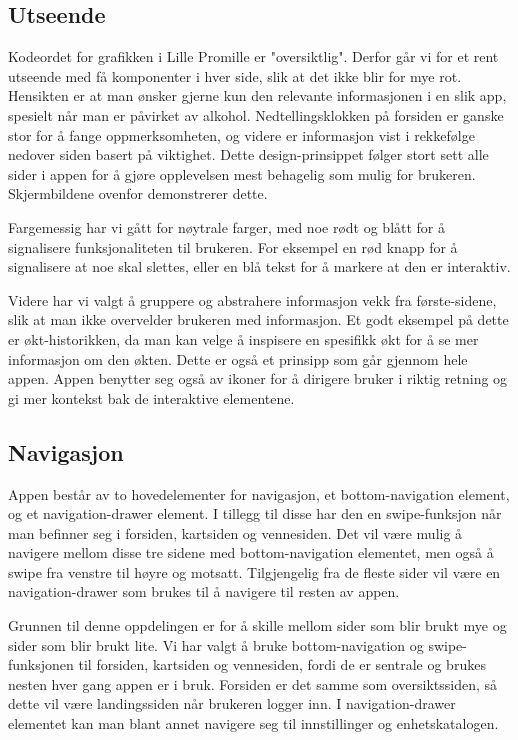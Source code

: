 \documentclass[12pt]{article}
\begin{document}
\subsection{Utseende}
Kodeordet for grafikken i Lille Promille er "oversiktlig". Derfor går vi for et rent utseende med få komponenter i hver side, slik at det ikke blir for mye rot. Hensikten er at man ønsker gjerne kun den relevante informasjonen i en slik app, spesielt når man er påvirket av alkohol. Nedtellingsklokken på forsiden er ganske stor for å fange oppmerksomheten, og videre er informasjon vist i rekkefølge nedover siden basert på viktighet. Dette design-prinsippet følger stort sett alle sider i appen for å gjøre opplevelsen mest behagelig som mulig for brukeren. Skjermbildene ovenfor demonstrerer dette.

Fargemessig har vi gått for nøytrale farger, med noe rødt og blått for å signalisere funksjonaliteten til brukeren. For eksempel en rød knapp for å signalisere at noe skal slettes, eller en blå tekst for å markere at den er interaktiv.

Videre har vi valgt å gruppere og abstrahere informasjon vekk fra første-sidene, slik at man ikke overvelder brukeren med informasjon. Et godt eksempel på dette er økt-historikken, da man kan velge å inspisere en spesifikk økt for å se mer informasjon om den økten. Dette er også et prinsipp som går gjennom hele appen. Appen benytter seg også av ikoner for å dirigere bruker i riktig retning og gi mer kontekst bak de interaktive elementene.

\subsection{Navigasjon}
Appen består av to hovedelementer for navigasjon, et bottom-navigation element, og et navigation-drawer element. I tillegg til disse har den en swipe-funksjon når man befinner seg i forsiden, kartsiden og vennesiden. Det vil være mulig å navigere mellom disse tre sidene med bottom-navigation elementet, men også å swipe fra venstre til høyre og motsatt. Tilgjengelig fra de fleste sider vil være en navigation-drawer som brukes til å navigere til resten av appen.

Grunnen til denne oppdelingen er for å skille mellom sider som blir brukt mye og sider som blir brukt lite. Vi har valgt å bruke bottom-navigation og swipe-funksjonen til forsiden, kartsiden og vennesiden, fordi de er sentrale og brukes nesten hver gang appen er i bruk. Forsiden er det samme som oversiktssiden, så dette vil være landingssiden når brukeren logger inn. I navigation-drawer elementet kan man blant annet navigere seg til innstillinger og enhetskatalogen.
\end{document}
